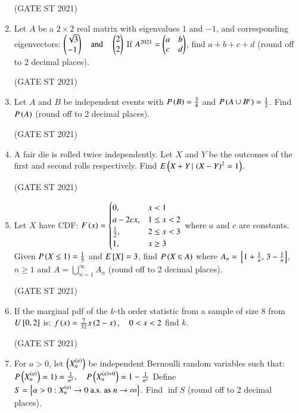 \documentclass[journal,12pt,onecolumn]{IEEEtran}
\theoremstyle{remark}
\begin{document}
\begin{enumerate}
\hfill (GATE ST 2021) \\

\item
Let $A$ be a $2 \times 2$ real matrix with eigenvalues $1$ and $-1$, and corresponding eigenvectors:
$
\begin{pmatrix} \sqrt{3} \\ -1 \end{pmatrix}
\quad \text{and} \quad
\begin{pmatrix} 2 \\ 2 \end{pmatrix}
$
If $A^{2021} = \begin{pmatrix} a & b \\ c & d \end{pmatrix}$,  
find $a+b+c+d$ (round off to 2 decimal places).

\hfill (GATE ST 2021) \\

\item
Let $A$ and $B$ be independent events with $P\left(B\right) = \frac{3}{4}$ and $P\left(A \cup B^c\right) = \frac12$.  
Find $P\left(A\right)$ (round off to 2 decimal places).

\hfill (GATE ST 2021) \\

\item
A fair die is rolled twice independently.  
Let $X$ and $Y$ be the outcomes of the first and second rolls respectively.  
Find $E\left(X + Y \, | \, \left(X - Y\right)^2 = 1\right)$.

\hfill (GATE ST 2021) \\

\item
Let $X$ have CDF:
$
F\brak{x} =
\begin{cases}
    
0, & x < 1 \\
a - 2c x, & 1 \le x < 2 \\
\frac12, & 2 \le x < 3 \\
1, & x \ge 3
\end{cases}
$
where $a$ and $c$ are constants.  
Given $P\brak{X \leq 1} = \frac15$ and $E\sbrak{X} = 3$,  
find $P\brak{X \in A}$ where $A_n = \sbrak{1+\frac1n,\, 3 - \frac1n}$, $n \ge 1$ and $A = \bigcup_{n=1}^\infty A_n$ (round off to 2 decimal places).

\hfill (GATE ST 2021) \\


\item
If the marginal pdf of the $k$-th order statistic from a sample of size 8 from $U{}\left[0,2\right]$ is:
$
f\left(x\right) = \frac{7}{32} x \left(2-x\right), \quad 0 < x < 2
$
find $k$.

\hfill (GATE ST 2021) \\

\item
For $a > 0$, let $\left( X_n^{\left(a\right)} \right)$ be independent Bernoulli random variables such that:
$
P\left(X_n^{\left(a\right)}\right) = 1) = \frac{1}{n^\alpha}, \quad P\left(X_n^{\left(a\right) = 0}\right) = 1 - \frac{1}{n^\alpha}
$
Define $S = \left\{ \alpha > 0 : X_n^{\left(a\right)} \to 0 \ \text{a.s. as} \ n \to \infty \right\}$.  
Find $\inf S$ (round off to 2 decimal places).


\end{enumerate}
\end{document}
